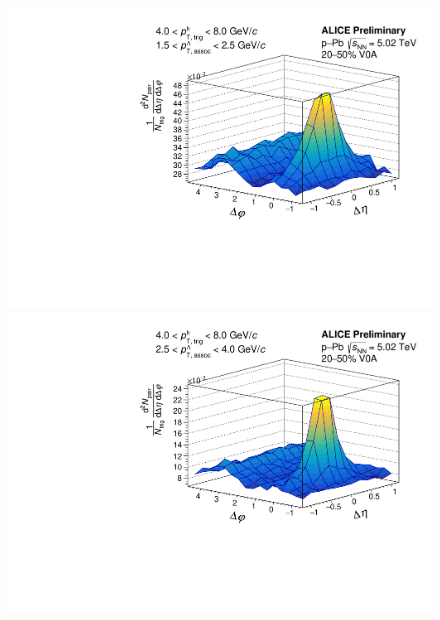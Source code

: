 \begin{figure}[ht]
\begin{minipage}{0.48\textwidth}
	\end{minipage}
	\begin{minipage}{0.48\textwidth}
		\includegraphics[width=\textwidth]{figures/analysis/h_lambda_2d_mixcor_fancy_label_20_50_lowpt.pdf}
	\end{minipage}
	\begin{minipage}{0.48\textwidth}
		\includegraphics[width=\textwidth]{figures/analysis/h_lambda_2d_mixcor_fancy_label_20_50_highpt.pdf}
	\end{minipage}
	\begin{minipage}{0.48\textwidth}

\end{minipage}
\end{figure}
